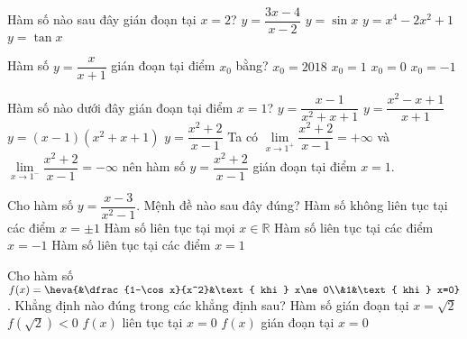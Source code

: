 \begin{ex}%
	Hàm số nào sau đây gián đoạn tại $x=2$?
	\choice
	{\True $y=\dfrac{3x-4}{x-2}$}
	{$y=\sin x$}
	{$y=x^4-2x^2+1$}
	{$y=\tan x$}
\end{ex}
\begin{ex}%
	Hàm số $y=\dfrac{x}{x+1}$ gián đoạn tại điểm $x_0$ bằng?
	\choice
	{ $x_0=2018$}
	{ $x_0=1$}
	{ $x_0=0$}
	{\True $x_0=-1$}
\end{ex}
\begin{ex}%
	Hàm số nào dưới đây gián đoạn tại điểm $x=1$?
	\choice
	{$y=\dfrac{x-1}{x^2+x+1}$}
	{$y=\dfrac{x^2-x+1}{x+1}$}
	{$y=(x-1)(x^2+x+1)$}
	{\True $y=\dfrac{x^2+2}{x-1}$}
	\loigiai
	{
		Ta có $\lim\limits_{x\to1^+}\dfrac{x^2+2}{x-1}=+\infty$ và $\lim\limits_{x\to1^-}\dfrac{x^2+2}{x-1}=-\infty$ nên hàm số $y=\dfrac{x^2+2}{x-1}$ gián đoạn tại điểm $x=1$.
	}
\end{ex}
\begin{ex}%
	Cho hàm số $y=\dfrac{x-3}{x^2-1}$. Mệnh đề nào sau đây đúng?
	\choice
	{\True Hàm số không liên tục tại các điểm $x=\pm 1$}
	{Hàm số liên tục tại mọi $x\in \mathbb{R}$}
	{Hàm số liên tục tại các điểm $x=-1$}
	{Hàm số liên tục tại các điểm $x=1$}
\end{ex}
\begin{ex}%
	Cho hàm số $f(x)=\heva{&\dfrac{1-\cos x}{x^2}&\text{ khi } x\ne 0\\&1&\text{ khi } x=0}$.
	Khẳng định nào đúng trong các khẳng định sau?
	\choice
	{Hàm số gián đoạn tại $x=\sqrt{2}$}
	{$f(\sqrt{2})<0$}
	{$f(x)$ liên tục tại $x=0$}	
	{\True $f(x)$ gián đoạn tại $x=0$}
\end{ex}

